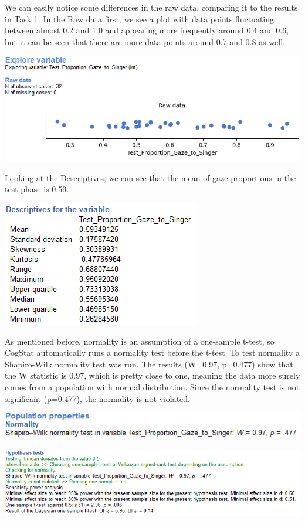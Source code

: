 \documentclass[
]{book}
\begin{document}
We can easily notice some differences in the raw data, comparing it to the results in Task 1. In the Raw data first, we see a plot with data points fluctuating between almost 0.2 and 1.0 and appearing more frequently around 0.4 and 0.6, but it can be seen that there are more data points around 0.7 and 0.8 as well.

\includegraphics{img/ch6/6.5expvarraw.png}

Looking at the Descriptives, we can see that the mean of gaze proportions in the test phase is 0.59.

\includegraphics{img/ch6/6.5descr.png}

As mentioned before, normality is an assumption of a one-sample t-test, so CogStat automatically runs a normality test before the t-test. To test normality a Shapiro-Wilk normality test was run. The results (W=0.97, p=0.477) show that the W statistic is 0.97, which is pretty close to one, meaning the data more surely comes from a population with normal distribution. Since the normality test is not significant (p=0.477), the normality is not violated.

\includegraphics{img/ch6/6.5poppropSW.png}

\includegraphics{img/ch6/6.5hyptest.png}
\end{document}
